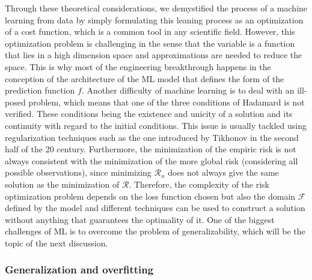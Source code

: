 \documentclass[main]{subfiles}
\begin{document}
Through these theoretical considerations, we demystified the process of a machine learning from data by simply formulating this leaning process as an optimization of a cost function, which is a common tool in any scientific field. However, this optimization problem is challenging in the sense that the variable is a function that lies in a high dimension space and approximations are needed to reduce the space. This is why most of the engineering breakthrough happens in the conception of the architecture of the ML model that defines the form of the prediction function $f$. Another difficulty of machine learning is to deal with an ill-posed problem, which means that one of the three conditions of Hadamard is not verified. These conditions being the existence and unicity of a solution and its continuity  with regard to the initial conditions. This issue is usually tackled using regularization techniques such as the one introduced by Tikhonov in the second half of the 20 century. Furthermore, the minimization of the empiric risk is not always consistent with the minimization of the more global risk (considering all possible observations), since minimizing $\mathcal{R}_n$ does not always give the same solution as the minimization of $\mathcal{R}$. Therefore, the complexity of the risk optimization problem depends on the loss function chosen but also the domain $\mathcal{F}$ defined by the model and different techniques can be used to construct a solution without anything that guarantees the optimality of it. One of the biggest challenges of ML is to overcome the problem of generalizability, which will be the topic of the next discussion.


\subsubsection{Generalization and overfitting}
\end{document}
